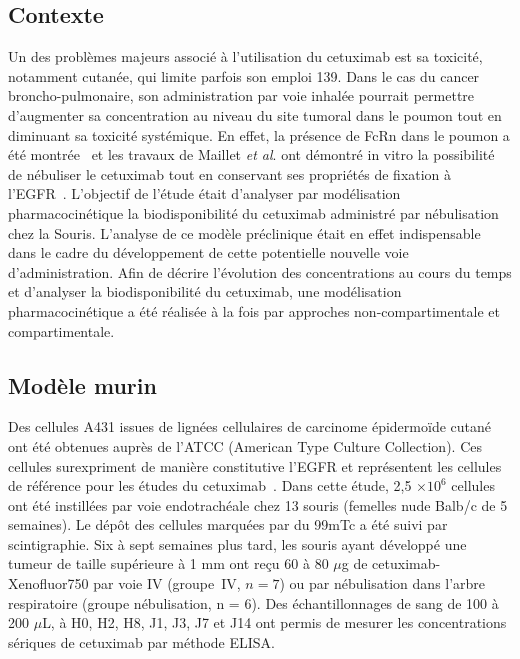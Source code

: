 \subsection{Contexte}
Un des problèmes majeurs associé à l'utilisation du cetuximab est sa toxicité, notamment cutanée, qui limite parfois son emploi 139. Dans le cas du cancer broncho-pulmonaire, son administration par voie inhalée pourrait permettre d'augmenter sa concentration au niveau du site tumoral dans le poumon tout en diminuant sa toxicité systémique. En effet, la présence de FcRn dans le poumon a été montrée~\citep{REF27} et les travaux de Maillet \textit{et al}. ont démontré in vitro la possibilité de nébuliser le cetuximab tout en conservant ses propriétés de fixation à l'EGFR~\citep{REF140}. L'objectif de l'étude était d'analyser par modélisation pharmacocinétique la biodisponibilité du cetuximab administré par nébulisation chez la Souris. L'analyse de ce modèle préclinique était en effet indispensable dans le cadre du développement de cette potentielle nouvelle voie d'administration. Afin de décrire l'évolution des concentrations au cours du temps et d'analyser la biodisponibilité du cetuximab, une modélisation pharmacocinétique a été réalisée à la fois par approches non-compartimentale et compartimentale. 

\subsection{Modèle murin}
Des cellules A431 issues de lignées cellulaires de carcinome épidermoïde cutané ont été obtenues auprès de l'ATCC (American Type Culture Collection). Ces cellules surexpriment de manière constitutive l'EGFR et représentent les cellules de référence pour les études du cetuximab~\citep{REF141}. Dans cette étude, 2,5 $\times 10^6$ cellules ont été instillées par voie endotrachéale chez 13 souris (femelles nude Balb/c de 5 semaines). Le dépôt des cellules marquées par du 99mTc a été suivi par scintigraphie. Six à sept semaines plus tard, les souris ayant développé une tumeur de taille supérieure à 1 mm ont reçu 60 à 80 $\mu$g de cetuximab-Xenofluor750 par voie IV (groupe~IV, $n = 7$) ou par nébulisation dans l'arbre respiratoire (groupe nébulisation, n = 6). Des échantillonnages de sang de 100 à 200 $\mu$L, à H0, H2, H8, J1, J3, J7 et J14 ont permis de mesurer les concentrations sériques de cetuximab par méthode ELISA.
